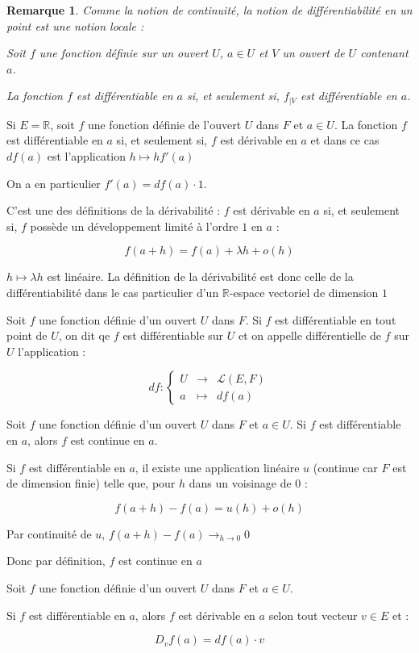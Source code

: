 \documentclass[a4paper,12pt]{book}
\newcommand{\Def}[2]{\begin{tcolorbox}[sharp corners, colback=white,colframe=blue!90!black!75, title=Définition : #1]#2\end{tcolorbox}}
\newcommand{\Prop}[2]{\begin{tcolorbox}[sharp corners, colback=white,colframe=red!90!black!75, title=Proposition : #1]#2\end{tcolorbox}}
\newcommand{\Pre}[1]{\begin{tcolorbox}[sharp corners, colback=white,colframe=green!60!green!30!black!75, title=Preuve]#1\end{tcolorbox}}
\newtheorem{Rem}{Remarque}[section]
\def\R{\mathbb{R}}
\begin{document}
\begin{Rem}
Comme la notion de continuité, la notion de différentiabilité en un point est une notion locale :
\par Soit $f$ une fonction définie sur un ouvert $U$, $a\in U$ et $V$ un ouvert de $U$ contenant $a$.
\par La fonction $f$ est différentiable en $a$ si, et seulement si, $f_{|V}$ est différentiable en $a$.
\end{Rem}
\Prop{}{Si $E=\R$, soit $f$ une fonction définie de l'ouvert $U$ dans $F$ et $a\in U$. La fonction $f$ est différentiable en $a$ si, et seulement si, $f$ est dérivable en $a$ et dans ce cas $df(a)$ est l'application $h\mapsto hf'(a)$
\par On a en particulier $f'(a) = df(a)\cdot 1$.}
\Pre{C'est une des définitions de la dérivabilité : $f$ est dérivable en $a$ si, et seulement si, $f$ possède un développement limité à l'ordre $1$ en $a$ :
\par $$ f(a+h) = f(a)+\lambda h+o(h)$$
\par $h\mapsto \lambda h$ est linéaire. La définition de la dérivabilité est donc celle de la différentiabilité dans le cas particulier d'un $\R$-espace vectoriel de dimension $1$}
\Def{}{Soit $f$ une fonction définie d'un ouvert $U$ dans $F$. Si $f$ est différentiable en tout point de $U$, on dit qe $f$ est différentiable sur $U$ et on appelle différentielle de $f$ sur $U$ l'application :
\par $$df:\left\{\begin{array}{rcl}U & \to & \mathcal{L}(E,F) \\ a & \mapsto & df(a)\end{array}\right.$$}
\Prop{}{Soit $f$ une fonction définie d'un ouvert $U$ dans $F$ et $a\in U$.
Si $f$ est différentiable en $a$, alors $f$ est continue en $a$.}
\Pre{Si $f$ est différentiable en $a$, il existe une application linéaire $u$ (continue car $F$ est de dimension finie) telle que, pour $h$ dans un voisinage de 0 :
\par $$f(a+h)-f(a) = u(h)+o(h)$$
\par Par continuité de $u$, $f(a+h)-f(a)\to_{h\to 0}0$
\par Donc par définition, $f$ est continue en $a$}
\Prop{}{Soit $f$ une fonction définie d'un ouvert $U$ dans $F$ et $a\in U$.
\par Si $f$ est différentiable en $a$, alors $f$ est dérivable en $a$ selon tout vecteur $v\in E$ et :
\par $$D_vf(a) = df(a)\cdot v$$}
\end{document}

